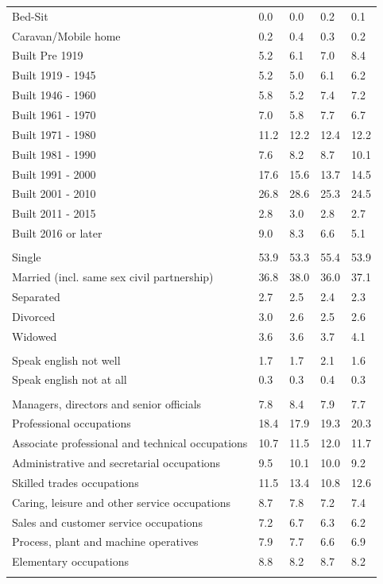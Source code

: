 \documentclass{article}
\begin{document}
\begin{table}[h]
\begin{tabular}{KTTTT}
Bed-Sit & 0.0& 0.0& 0.2& 0.1\\
Caravan/Mobile home & 0.2& 0.4& 0.3& 0.2\\
    \hline
Built Pre 1919 & 5.2& 6.1& 7.0& 8.4\\
Built 1919 - 1945 & 5.2& 5.0& 6.1& 6.2\\
Built  1946 - 1960 & 5.8& 5.2& 7.4& 7.2\\
Built  1961 - 1970 & 7.0& 5.8& 7.7& 6.7\\
Built  1971 - 1980 & 11.2& 12.2& 12.4& 12.2\\
Built  1981 - 1990 &  7.6&  8.2&  8.7& 10.1\\
Built  1991 - 2000 & 17.6& 15.6& 13.7& 14.5\\
Built  2001 - 2010 & 26.8& 28.6& 25.3& 24.5\\
Built  2011 - 2015 & 2.8& 3.0& 2.8& 2.7\\
Built  2016 or later & 9.0& 8.3& 6.6& 5.1\\
\hline
    \\
    \hline
Single & 53.9& 53.3& 55.4& 53.9\\
Married (incl. same sex civil partnership) & 36.8& 38.0& 36.0& 37.1\\
Separated  & 2.7& 2.5& 2.4& 2.3\\
Divorced  & 3.0& 2.6& 2.5& 2.6\\
Widowed & 3.6& 3.6& 3.7& 4.1\\
\hline
    \\ 
    \hline
Speak english not well & 1.7& 1.7& 2.1& 1.6\\
Speak english not at all & 0.3& 0.3& 0.4& 0.3\\
\hline
    \\
    \hline
Managers, directors and senior officials & 7.8& 8.4& 7.9& 7.7\\
Professional occupations & 18.4& 17.9& 19.3& 20.3\\
Associate professional and technical occupations & 10.7& 11.5& 12.0& 11.7\\
Administrative and secretarial occupations &  9.5& 10.1& 10.0&  9.2\\
Skilled trades occupations & 11.5& 13.4& 10.8& 12.6\\
Caring, leisure and other service occupations & 8.7& 7.8& 7.2& 7.4\\
Sales and customer service occupations & 7.2& 6.7& 6.3& 6.2\\
Process, plant and machine operatives & 7.9& 7.7& 6.6& 6.9\\
Elementary occupations & 8.8& 8.2& 8.7& 8.2\\
\hline
\end{tabular}
\end{table}
\end{document}
